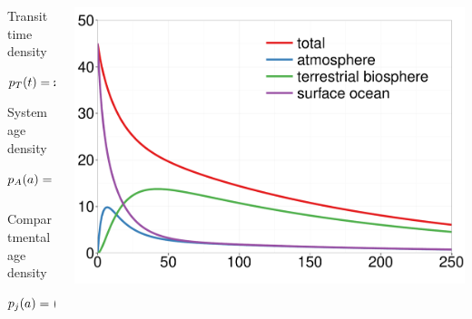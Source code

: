 \begin{columns}
	\setlength{\lc}{0.30\textwidth}
	\begin{column}{\lc}
		Transit time density
		
		$p_T(t) = \mathbf{z}^T\,e^{t\,\mathbf{\mathrm{A}}}\,\mathbf{u}$
		\vspace{.5cm}	
		
		System age density
		
		$p_A(a) =\sum\limits_j \left(e^{a\,\mathbf{\mathrm{A}}}\,\mathbf{u}\right)_j$
		\vspace{.5cm}	
		
		Compartmental \\
		age density

                $p_{j}(a) = \left(e^{a\,\mathbf{\mathrm{A}}}\,\mathbf{u}\right)_j$
	\end{column}
	\setlength{\rc}{\the\dimexpr (\textwidth-\lc) \relax }
	\begin{column}{\rc}
		\includegraphics[width=0.9\rc]{images/content/ss.pdf}
	\end{column}
\end{columns}

